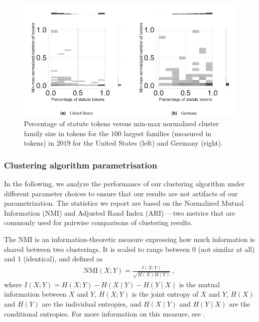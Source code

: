 \documentclass[utf8,sort&compress,numbers,square,table,hidelinks]{frontiers_suppmat} %
\begin{document}
\begin{figure}
	\includegraphics[width=\textwidth]{figure_si_family_top100}
	\caption{Percentage of statute tokens versus min-max normalized cluster family size in tokens for the $100$ largest families (measured in tokens) in $2019$ for the United States (left) and Germany (right).}\label{fig:families-top-100}
\end{figure}


\vspace*{12pt}
\subsubsection{Clustering algorithm parametrisation}

In the following, we analyze the performance of our clustering algorithm under different parameter choices to ensure that our results are not artifacts of our parametrization. 
The statistics we report are based on the Normalized Mutual Information (NMI) and Adjusted Rand Index (ARI)%
---two metrics that are commonly used for pairwise comparisons of clustering results.

The NMI is an information-theoretic measure expressing how much information is shared between two clusterings.
It is scaled to range between $0$ (not similar at all) and 1 (identical), and defined as
\begin{align*}
	\text{NMI}(X;Y) = \frac{I(X;Y)}{\sqrt{H(X)H(Y)}}~,
\end{align*}
where $I(X;Y) = H(X;Y)-H(X\mid Y)-H(Y\mid X)$ is the mutual information between $X$ and $Y$, $H(X;Y)$ is the joint entropy of $X$ and $Y$, 
$H(X)$ and $H(Y)$ are the individual entropies, 
and $H(X\mid Y)$ and $H(Y\mid X)$ are the conditional entropies.
For more information on this measure, see \cite{strehl2002}.
\end{document}
